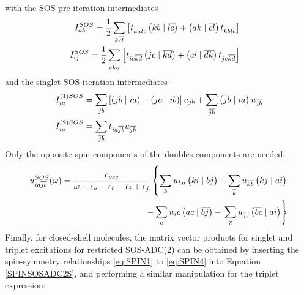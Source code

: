 \noindent with the SOS pre-iteration intermediates 
\begin{align}
\begin{split}
I_{ab}^{SOS} &= \frac{1}{2} \sum_{k\overline{cl}} \left[ t_{ka\overline{lc}} \left( kb \mid \overline{lc} \right) + \left( ak \mid \overline{cl} \right) t_{kb\overline{lc}} \right]
\end{split}
\\
\begin{split}
I_{ij}^{SOS} &= \frac{1}{2} \sum_{c\overline{kd}} \left[ t_{ic\overline{kd}} \left( jc \mid \overline{kd} \right) + \left( ci \mid \overline{dk} \right) t_{jc\overline{kd}} \right]  
\end{split}
\end{align}
\noindent and the singlet SOS iteration intermediates
\begin{align}
I_{ia}^{(1)SOS} &= \sum_{jb} \left[ \left( jb \mid ia \right) - \left( ja \mid ib \right) \right] u_{jb} + \sum_{\overline{jb}} \left( \overline{jb} \mid ia \right) u_{\overline{jb}}
\\
I_{ia}^{(2)SOS} &= \sum_{\overline{jb}} t_{ia\overline{jb}} u_{\overline{jb}}
\end{align}
\noindent Only the opposite-spin components of the doubles components are needed:
\begin{equation}
\begin{split}
u_{ia\overline{jb}}^{SOS}(\omega) = \frac{c_{osc}}{\omega - \epsilon_a - \epsilon_b + \epsilon_i + \epsilon_j} \left\lbrace \sum_k u_{ka} \left( ki \mid \overline{bj} \right) + \sum_{\overline{k}} u_{\overline{kb}} \left( \overline{kj} \mid ai \right) \right. \\ - \sum_c u_ic \left( ac \mid \overline{bj} \right) - \left. \sum_{\overline{c}} u_{\overline{jc}} \left( \overline{bc} \mid ai \right) \right\rbrace
\end{split}
\end{equation}
\noindent Finally, for closed-shell molecules, the matrix vector products for singlet and triplet excitations for restricted SOS-ADC(2) can be obtained by inserting the spin-symmetry relationships \ref{eq:SPIN1} to \ref{eq:SPIN4} into Equation \ref{SPINSOSADC2S}, and performing a similar manipulation for the triplet expression:
